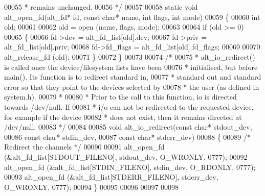 \begin{DoxyCode}
00055 \textcolor{comment}{ * remains unchanged.}
00056 \textcolor{comment}{ */}
00057 
00058 \textcolor{keyword}{static} \textcolor{keywordtype}{void} alt_open_fd(alt_fd* fd, \textcolor{keyword}{const} \textcolor{keywordtype}{char}* name, \textcolor{keywordtype}{int} flags, \textcolor{keywordtype}{int} mode)
00059 \{
00060   \textcolor{keywordtype}{int} old;
00061 
00062   old = open (name, flags, mode);
00063 
00064   \textcolor{keywordflow}{if} (old >= 0)
00065   \{
00066     fd->dev      = alt_fd_list[old].dev;
00067     fd->priv     = alt_fd_list[old].priv;
00068     fd->fd_flags = alt_fd_list[old].fd_flags;
00069 
00070     alt_release_fd (old);
00071   \}
00072 \} 
00073 
00074 \textcolor{comment}{/*}
00075 \textcolor{comment}{ * alt\_io\_redirect() is called once the device/filesystem lists have been }
00076 \textcolor{comment}{ * initialised, but before main(). Its function is to redirect standard in,}
00077 \textcolor{comment}{ * standard out and standard error so that they point to the devices selected by}
00078 \textcolor{comment}{ * the user (as defined in system.h).}
00079 \textcolor{comment}{ *}
00080 \textcolor{comment}{ * Prior to the call to this function, io is directed towards /dev/null. If}
00081 \textcolor{comment}{ * i/o can not be redirected to the requested device, for example if the device }
00082 \textcolor{comment}{ * does not exist, then it remains directed at /dev/null. }
00083 \textcolor{comment}{ */}
00084  
00085 \textcolor{keywordtype}{void} alt_io_redirect(\textcolor{keyword}{const} \textcolor{keywordtype}{char}* stdout\_dev, 
00086                      \textcolor{keyword}{const} \textcolor{keywordtype}{char}* stdin\_dev, 
00087                      \textcolor{keyword}{const} \textcolor{keywordtype}{char}* stderr\_dev)
00088 \{
00089   \textcolor{comment}{/* Redirect the channels */}
00090 
00091   alt_open_fd (&alt_fd_list[STDOUT\_FILENO], stdout\_dev, O\_WRONLY, 0777);
00092   alt_open_fd (&alt_fd_list[STDIN\_FILENO], stdin\_dev, O\_RDONLY, 0777);
00093   alt_open_fd (&alt_fd_list[STDERR\_FILENO], stderr\_dev, O\_WRONLY, 0777);
00094 \}  
00095 
00096 
00097 
00098 
\end{DoxyCode}
